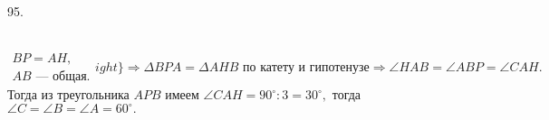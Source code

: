 95. \begin{figure}[ht!]
\end{figure}\\
$\left.\begin{array}{l}BP=AH,\\
AB\text{ --- общая.} \end{array}
ight\}\Rightarrow \Delta BPA=\Delta AHB\text{ по катету и гипотенузе}\Rightarrow \angle HAB=\angle ABP=\angle CAH.$ Тогда из треугольника $APB$ имеем $\angle CAH=90^\circ:3=30^\circ,$ тогда $\angle C=\angle B=\angle A=60^\circ.$\\
